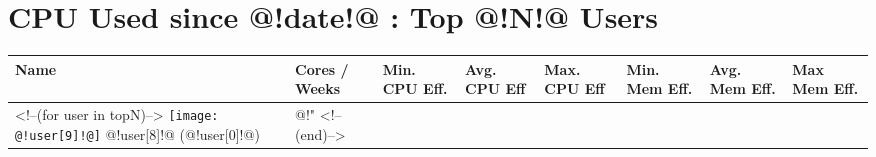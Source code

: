 \documentclass{article}[10pt]
\begin{document}
\section*{CPU Used since @!date!@ : Top @!N!@ Users}
\begin{longtable}{|l|p{10mm}|p{10mm}|p{10mm}|p{10mm}|p{10mm}|p{15mm}|p{20mm}|}
\hline
Name & Cores / Weeks & Min. CPU Eff. & Avg. CPU Eff & Max. CPU Eff & Min. Mem Eff. & Avg. Mem Eff. & Max Mem Eff. \\
\hline
\hline
<!--(for user in topN)-->
\texttt{[image: @!user[9]!@]} @!user[8]!@ (@!user[0]!@) & @!"%
\hline
<!--(end)-->
\end{longtable}
\end{document}
